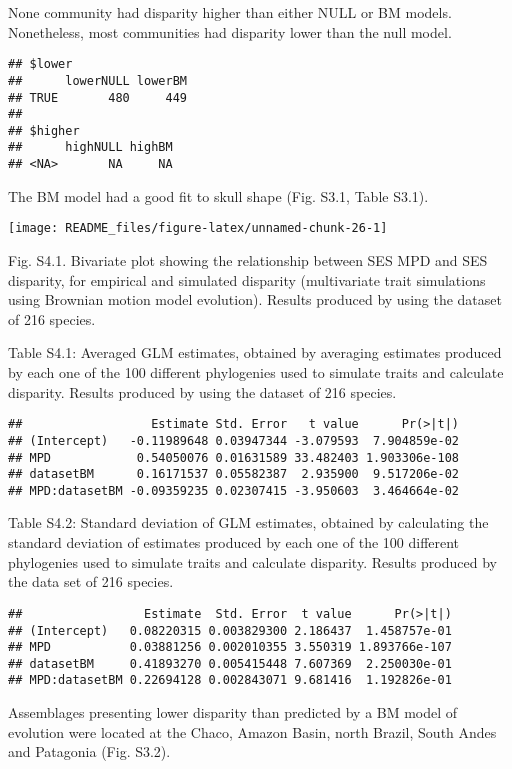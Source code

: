 \documentclass[
]{article}
\begin{document}
None community had disparity higher than either NULL or BM models.
Nonetheless, most communities had disparity lower than the null model.

\begin{verbatim}
## $lower
##      lowerNULL lowerBM
## TRUE       480     449
## 
## $higher
##      highNULL highBM
## <NA>       NA     NA
\end{verbatim}

The BM model had a good fit to skull shape (Fig. S3.1, Table S3.1).

\begin{center}\texttt{[image: README\_files/figure-latex/unnamed-chunk-26-1]} \end{center}

Fig. S4.1. Bivariate plot showing the relationship between SES MPD and
SES disparity, for empirical and simulated disparity (multivariate trait
simulations using Brownian motion model evolution). Results produced by
using the dataset of 216 species.

Table S4.1: Averaged GLM estimates, obtained by averaging estimates
produced by each one of the 100 different phylogenies used to simulate
traits and calculate disparity. Results produced by using the dataset of
216 species.

\begin{verbatim}
##                  Estimate Std. Error   t value      Pr(>|t|)
## (Intercept)   -0.11989648 0.03947344 -3.079593  7.904859e-02
## MPD            0.54050076 0.01631589 33.482403 1.903306e-108
## datasetBM      0.16171537 0.05582387  2.935900  9.517206e-02
## MPD:datasetBM -0.09359235 0.02307415 -3.950603  3.464664e-02
\end{verbatim}

Table S4.2: Standard deviation of GLM estimates, obtained by calculating
the standard deviation of estimates produced by each one of the 100
different phylogenies used to simulate traits and calculate disparity.
Results produced by the data set of 216 species.

\begin{verbatim}
##                 Estimate  Std. Error  t value      Pr(>|t|)
## (Intercept)   0.08220315 0.003829300 2.186437  1.458757e-01
## MPD           0.03881256 0.002010355 3.550319 1.893766e-107
## datasetBM     0.41893270 0.005415448 7.607369  2.250030e-01
## MPD:datasetBM 0.22694128 0.002843071 9.681416  1.192826e-01
\end{verbatim}

Assemblages presenting lower disparity than predicted by a BM model of
evolution were located at the Chaco, Amazon Basin, north Brazil, South
Andes and Patagonia (Fig. S3.2).
\end{document}
